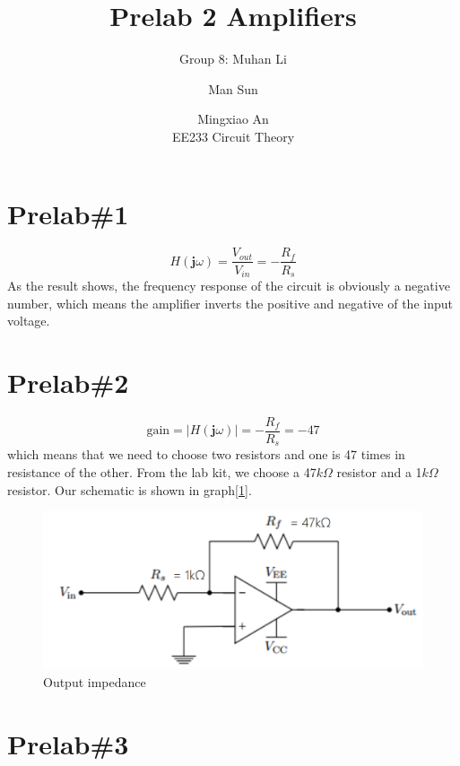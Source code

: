 \documentclass{IEEEtran}
\title{Prelab 2 Amplifiers}
\author{Group 8: Muhan Li \and Man Sun \and Mingxiao An \\ EE233 Circuit Theory}
\begin{document}
	\maketitle
	\section{\textbf{Prelab\#1}}
	\begin{equation*}
		H(\mathbf{j}\omega) = \frac{V_{out}}{V_{in}} = -\frac{R_f}{R_s}
	\end{equation*}
	\phantom{ } As the result shows, the frequency response of the circuit is obviously a negative number, which means the amplifier inverts the positive and negative of the input voltage.\\
	\section{\textbf{Prelab\#2}}
	\begin{equation*}
		\mathrm{gain} = | H(\mathbf{j}\omega) | = -\frac{R_f}{R_s} = -47
	\end{equation*}
	which means that we need to choose two resistors and one is 47 times in resistance of the other. From the lab kit, we choose a 47$ \si{k\Omega} $ resistor and a 1$ \si{k\Omega} $ resistor. Our schematic is shown in graph[\ref{fig:201}].
	
	\begin{figure}[!htbp]
		\centering
		\begin{framed}
			\includegraphics[width=\linewidth]{images/2_1.PNG}
			\caption{Output impedance}
			\label{fig:201}
		\end{framed}
	\end{figure}

	\section{\textbf{Prelab\#3}}
\end{document}
